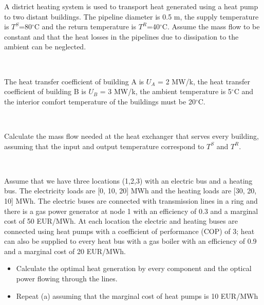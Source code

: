 \documentclass[10pt]{article}
\newenvironment{problem}[2][Problem]{\begin{trivlist}
\item[\hskip \labelsep {\bfseries #1}\hskip \labelsep {\bfseries #2.}]}{\end{trivlist}}
\begin{document}
\begin{problem}{7.2}

A district heating system is used to transport heat generated using a heat pump to two distant buildings. The pipeline diameter is 0.5 m, the supply temperature is $T^S$=80$^{\circ}$C and the return temperature is $T^R$=40$^{\circ}$C. Assume the mass flow to be constant and that the heat losses in the pipelines due to dissipation to the ambient can be neglected.

\

The heat transfer coefficient of building A is $U_A$ = 2 MW/k, the heat transfer coefficient of building B is $U_B$ = 3 MW/k, the ambient temperature is 5$^{\circ}$C and the interior comfort temperature of the buildings must be 20$^{\circ}$C.

\

Calculate the mass flow needed at the heat exchanger that serves every building, assuming that the input and output temperature correspond to $T^S$ and $T^R$.


\end{problem}

\

\begin{problem}{7.3}

Assume that we have three locations (1,2,3) with an electric bus and a heating bus. The electricity loads are [0, 10, 20] MWh and the heating loads are [30, 20, 10] MWh. The electric buses are connected with transmission lines in a ring and there is a gas power generator at node 1 with an efficiency of 0.3 and a marginal cost of 50 EUR/MWh. At each location the electric and heating buses are connected using heat pumps with a coefficient of performance (COP) of 3; heat can also be supplied to every heat bus with a gas boiler with an efficiency of 0.9 and a marginal cost of 20 EUR/MWh.


\begin{itemize}
\item[a)] Calculate the optimal heat generation by every component and the optical power flowing through the lines.

\item[b)] Repeat (a) assuming that the marginal cost of heat pumps is 10 EUR/MWh

\end{itemize}

\end{problem}

\
\end{document}
